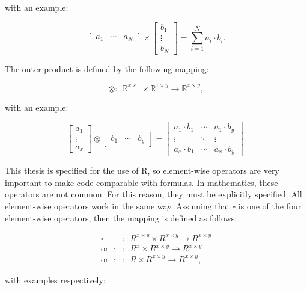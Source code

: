 \documentclass[
  oneside, a4paper, 12pt, openany]{book}
\theoremstyle{definition}
\theoremstyle{definition}
\theoremstyle{definition}
\theoremstyle{definition}
\theoremstyle{remark}
\begin{document}
with an example:

\[
\begin{bmatrix}a_{1} &\cdots  &  a_{N}\end{bmatrix}
\times
\begin{bmatrix}b_{1}\\ \vdots \\  b_{N}\end{bmatrix}
=
\sum_{i=1}^N a_i \cdot  b_i.
\]

The outer product is defined by the following mapping:

\[\otimes: \ \ \mathbb{R}^{x \times 1} \times \mathbb{R}^{1 \times y} \rightarrow \mathbb{R}^{x \times y},\]

with an example:

\[
\begin{bmatrix}a_{1}\\ \vdots \\ a_{x}\end{bmatrix}
\otimes
\begin{bmatrix}b_{1} &\cdots  & b_{y}\end{bmatrix}
=
\begin{bmatrix}a_{1} \cdot b_{1} &\cdots  & a_{1} \cdot b_{y} \\ \vdots & \ddots & \vdots  \\ a_{x} \cdot b_{1}  & \cdots & a_{x} \cdot b_{y} \end{bmatrix}.
\]

This thesis is specified for the use of R, so element-wise operators are very important to make code comparable with formulas. In mathematics, these operators are not common. For this reason, they must be explicitly specified. All element-wise operators work in the same way. Assuming that \(\square\) is one of the four element-wise operators, then the mapping is defined as follows:

\begin{align*}
\square &: \ \ R^{x \times y} \times R^{x \times y}  \rightarrow R^{x \times y}\\
\text{or }\ \square &: \ \ R^{x} \times R^{x \times y}  \rightarrow R^{x \times y}\\
\text{or }\ \square &: \ \ R \times R^{x \times y}  \rightarrow R^{x \times y},
\end{align*}

with examples respectively:
\end{document}
